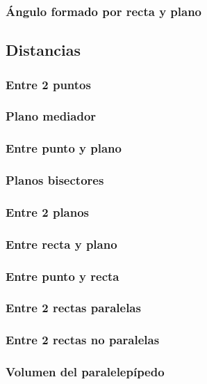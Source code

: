 \subsubsection{Ángulo formado por recta y plano}

\subsection{Distancias}
\subsubsection{Entre 2 puntos}
\subsubsection{Plano mediador}
\subsubsection{Entre punto y plano}
\subsubsection{Planos bisectores}
\subsubsection{Entre 2 planos}
\subsubsection{Entre recta y plano}
\subsubsection{Entre punto y recta}
\subsubsection{Entre 2 rectas paralelas}
\subsubsection{Entre 2 rectas no paralelas}

\subsubsection{Volumen del paralelepípedo}
